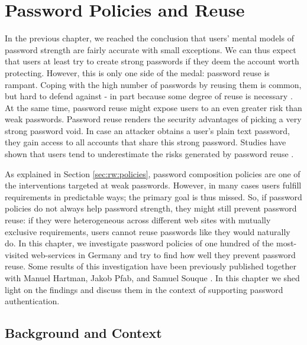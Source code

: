 \chapter[Password Policies and Reuse]{Password Policies and Reuse}\label{chap:policies_reuse}
In the previous chapter, we reached the conclusion that users' mental models of password strength are fairly accurate with small exceptions. We can thus expect that users at least try to create strong passwords if they deem the account worth protecting. 
However, this is only one side of the medal: password reuse is rampant. Coping with the high number of passwords by reusing them is common, but hard to defend against - in part because some degree of reuse is necessary \cite{Florencio2014PasswordPortfoliosFiniteUser, ZhangKennedy2016RevisitingPasswordRules}.  At the same time, password reuse might expose users to an even greater risk than weak passwords. Password reuse renders the security advantages of picking a very strong password void. In case an attacker obtains a user's plain text password, they gain access to all accounts that share this strong password. Studies have shown that users tend to underestimate the risks generated by password reuse \ar.

As explained in Section \ref{sec:rw:policies}, password composition policies are one of the interventions targeted at weak passwords. However, in many cases users fulfill requirements in predictable ways; the primary goal is thus missed. So, if password policies do not always help password strength, they might still prevent password reuse: if they were heterogeneous across different web sites with mutually exclusive requirements, users cannot reuse passwords like they would naturally do. In this chapter, we investigate password policies of one hundred of the most-visited web-services in Germany and try to find how well they prevent password reuse. Some results of this investigation have been previously published together with Manuel Hartman, Jakob Pfab, and Samuel Souque \cite{Seitz2017PoliciesReuse}. In this chapter we shed light on the findings and discuss them in the context of supporting password authentication. 

\section{Background and Context}


